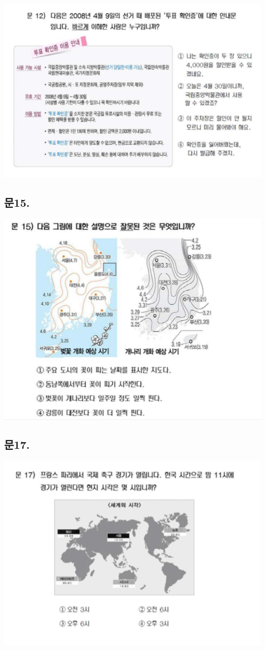 \documentclass[
]{book}
\begin{document}
\begin{flushleft}\includegraphics[width=0.75\linewidth]{./pics/Q12} \end{flushleft}

\subsection{문15.}\label{uxbb3815.}

\begin{flushleft}\includegraphics[width=0.75\linewidth]{./pics/Q15} \end{flushleft}

\subsection{문17.}\label{uxbb3817.}

\begin{flushleft}\includegraphics[width=0.75\linewidth]{./pics/Q17} \end{flushleft}
\end{document}
